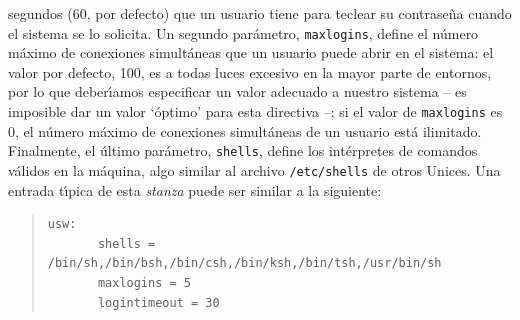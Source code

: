 segundos (60, por defecto) que un usuario tiene para teclear su contrase\~na
cuando el sistema se lo solicita. Un segundo par\'ametro, {\tt maxlogins}, 
define el n\'umero m\'aximo de conexiones simult\'aneas que un usuario puede
abrir en el sistema: el valor por defecto, 100, es a todas luces excesivo en la
mayor parte de entornos, por lo que deber\'{\i}amos especificar un valor 
adecuado a nuestro sistema -- es imposible dar un valor `\'optimo' para esta
directiva --; si el valor de {\tt maxlogins} es 0, el n\'umero m\'aximo de 
conexiones simult\'aneas de un usuario est\'a ilimitado. Finalmente, el \'ultimo
par\'ametro, {\tt shells}, define los int\'erpretes de comandos v\'alidos en la 
m\'aquina, algo similar al archivo {\tt /etc/shells} de otros Unices. Una 
entrada t\'{\i}pica de esta {\it stanza} puede ser similar a la siguiente:
\begin{quote}
\begin{verbatim}
usw:
       shells = /bin/sh,/bin/bsh,/bin/csh,/bin/ksh,/bin/tsh,/usr/bin/sh
       maxlogins = 5
       logintimeout = 30
\end{verbatim}
\end{quote}

